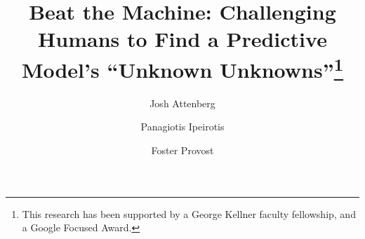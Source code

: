 \documentclass[smallcondensed]{svjour3}
\begin{document}
 
\title{Beat the Machine: Challenging Humans to Find a Predictive Model's ``Unknown Unknowns''\thanks{This research has been supported by a George Kellner faculty fellowship, and a Google Focused Award.}}


\author{Josh Attenberg         \and   Panagiotis Ipeirotis \and Foster Provost
}



%
%
%





\maketitle
\end{document}
